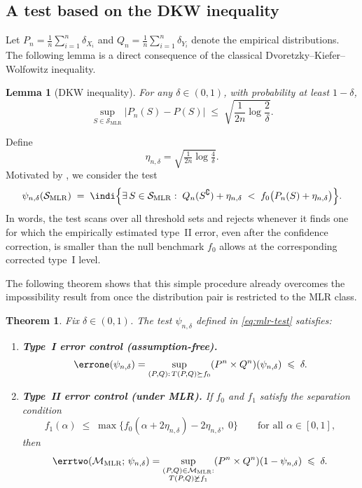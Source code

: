 \documentclass[english]{article}
\theoremstyle{plain}
\newtheorem{theorem}{Theorem}[section]
\newtheorem{lemma}{Lemma}[section]
\theoremstyle{definition}
\newcommand{\Toff}[2]{T(#1,#2)}
\newcommand{\fnull}{f_0}
\newcommand{\falt}{f_1}
\newcommand{\smlr}{\mathcal{S}_{\mathrm{MLR}}}     %
\newcommand{\etaND}{\eta_{n,\delta}}               %
\begin{document}
\subsection{A test based on the DKW inequality}

Let $P_n = \frac{1}{n}\sum_{i=1}^n \delta_{X_i}$ and $Q_n = \frac{1}{n}\sum_{i=1}^n \delta_{Y_i}$
denote the empirical distributions. The following lemma is a direct
consequence of the classical Dvoretzky--Kiefer--Wolfowitz inequality.

\begin{lemma}[DKW inequality]\label{lemma:DKW}
For any $\delta\in(0,1)$, with probability at least $1-\delta$,
\[
\sup_{S\in\smlr}\big|P_n(S)-P(S)\big|
\;\leqslant\;
\sqrt{\frac{1}{2n}\log\frac{2}{\delta}}.
\]
\end{lemma}

\noindent Define
\[
\etaND = \sqrt{\tfrac{1}{2n}\log\tfrac{4}{\delta}}.
\]
Motivated by , we consider the test
\begin{equation}\label{eq:mlr-test}
\psi_{n,\delta}(\smlr)
\;=\;
\indi\Big\{\exists\, S \in \smlr:\;
Q_n(S^{\complement}) + \etaND
\;<\;
\fnull\big(P_n(S) + \etaND\big)\Big\}.
\end{equation}
In words, the test scans over all threshold sets and rejects whenever it finds
one for which the empirically estimated type~II error, even after the
confidence correction, is smaller than the null benchmark $\fnull$ allows at the
corresponding corrected type~I level.

The following theorem shows that this simple procedure already overcomes the
impossibility result from  once the distribution pair is
restricted to the MLR class.

\begin{theorem}\label{thm:mlr}
Fix $\delta \in (0,1)$. The test $\psi_{n,\delta}$ defined in
\eqref{eq:mlr-test} satisfies:

\begin{enumerate}[label=(\roman*)]
\item \textbf{Type~I error control (assumption-free).}
\[
\errone(\psi_{n,\delta})
=
\sup_{(P,Q):\, \Toff{P}{Q}\succeq \fnull}
(P^n \times Q^n)(\psi_{n,\delta})
\;\leqslant\;
\delta.
\]

\item \textbf{Type~II error control (under MLR).}
If $\fnull$ and $\falt$ satisfy the separation condition
\begin{equation}\label{eq:mlr-sep}
\falt(\alpha)
\;\leqslant\;
\max\big\{\fnull(\alpha + 2\etaND) - 2\etaND,\; 0\big\}
\qquad \text{for all } \alpha \in [0,1],
\end{equation}
then
\[
\errtwo(\mathcal M_{\mathrm{MLR}};\, \psi_{n,\delta})
=
\sup_{\substack{(P,Q) \in \mathcal M_{\mathrm{MLR}}:\\ \Toff{P}{Q}\not\succeq \falt}}
(P^n \times Q^n)(1 - \psi_{n,\delta})
\;\leqslant\;
\delta.
\]
\end{enumerate}
\end{theorem}
\end{document}
